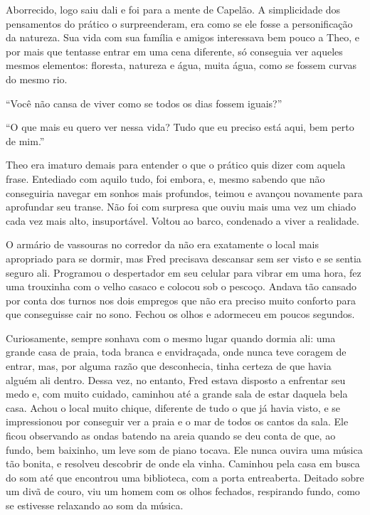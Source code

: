 Aborrecido, logo saiu dali e foi para a mente de Capelão. A simplicidade
dos pensamentos do prático o surpreenderam, era como se ele fosse a
personificação da natureza. Sua vida com sua família e amigos
interessava bem pouco a Theo, e por mais que tentasse entrar em uma cena
diferente, só conseguia ver aqueles mesmos elementos: floresta, natureza
e água, muita água, como se fossem curvas do mesmo rio.

``Você não cansa de viver como se todos os dias fossem iguais?''

``O que mais eu quero ver nessa vida? Tudo que eu preciso está aqui, bem
perto de mim.''

Theo era imaturo demais para entender o que o prático quis dizer com
aquela frase. Entediado com aquilo tudo, foi embora, e, mesmo sabendo que
não conseguiria navegar em sonhos mais profundos, teimou e avançou
novamente para aprofundar seu transe. Não foi com surpresa que ouviu
mais uma vez um chiado cada vez mais alto, insuportável. Voltou ao
barco, condenado a viver a realidade.

\asterisc

O armário de vassouras no corredor da  não era exatamente o local
mais apropriado para se dormir, mas Fred precisava descansar sem ser
visto e se sentia seguro ali. Programou o despertador em seu celular
para vibrar em uma hora, fez uma trouxinha com o velho casaco e
colocou sob o pescoço. Andava tão cansado por conta dos turnos
nos dois empregos que não era preciso muito conforto para que
conseguisse cair no sono. Fechou os olhos e adormeceu em poucos
segundos.

Curiosamente, sempre sonhava com o mesmo lugar quando dormia ali: uma
grande casa de praia, toda branca e envidraçada, onde nunca teve coragem
de entrar, mas, por alguma razão que desconhecia, tinha certeza de que
havia alguém ali dentro. Dessa vez, no entanto, Fred estava disposto a
enfrentar seu medo e, com muito cuidado, caminhou até a grande
sala de estar daquela bela casa. Achou o local muito chique, diferente
de tudo o que já havia visto, e se impressionou por conseguir ver a praia
e o mar de todos os cantos da sala. Ele ficou observando as
ondas batendo na areia quando se deu conta de que, ao fundo, bem
baixinho, um leve som de piano tocava. Ele nunca ouvira uma música tão
bonita, e resolveu descobrir de onde ela vinha. Caminhou pela casa em
busca do som até que encontrou uma biblioteca, com a porta entreaberta.
Deitado sobre um divã de couro, viu um homem com os olhos fechados,
respirando fundo, como se estivesse relaxando ao som da música.

